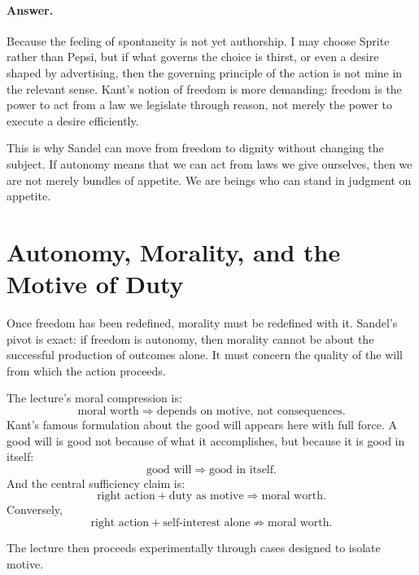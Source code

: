 \paragraph{Answer.} Because the feeling of spontaneity is not yet authorship. I may choose Sprite rather than Pepsi, but if what governs the choice is thirst, or even a desire shaped by advertising, then the governing principle of the action is not mine in the relevant sense. Kant's notion of freedom is more demanding: freedom is the power to act from a law we legislate through reason, not merely the power to execute a desire efficiently.

This is why Sandel can move from freedom to dignity without changing the subject. If autonomy means that we can act from laws we give ourselves, then we are not merely bundles of appetite. We are beings who can stand in judgment on appetite.

\section{Autonomy, Morality, and the Motive of Duty}

Once freedom has been redefined, morality must be redefined with it. Sandel's pivot is exact: if freedom is autonomy, then morality cannot be about the successful production of outcomes alone. It must concern the quality of the will from which the action proceeds.

The lecture's moral compression is:
\begin{equation}
\text{moral worth} \Longrightarrow \text{depends on motive, not consequences}.
\end{equation}
Kant's famous formulation about the good will appears here with full force. A good will is good not because of what it accomplishes, but because it is good in itself:
\begin{equation}
\text{good will} \Longrightarrow \text{good in itself}.
\end{equation}
And the central sufficiency claim is:
\begin{equation}
\text{right action} + \text{duty as motive} \Longrightarrow \text{moral worth}.
\end{equation}
Conversely,
\begin{equation}
\text{right action} + \text{self-interest alone} \not\Longrightarrow \text{moral worth}.
\end{equation}

The lecture then proceeds experimentally through cases designed to isolate motive.


